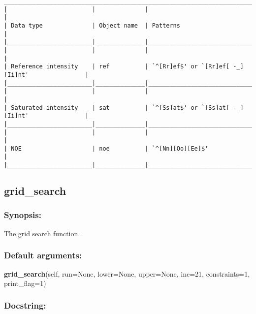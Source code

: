 {\begin{verbatim}
____________________________________________________________________________________________
|                        |              |                                                  |
| Data type              | Object name  | Patterns                                         |
|________________________|______________|__________________________________________________|
|                        |              |                                                  |
| Reference intensity    | ref          | `^[Rr]ef$' or `[Rr]ef[ -_][Ii]nt'                |
|________________________|______________|__________________________________________________|
|                        |              |                                                  |
| Saturated intensity    | sat          | `^[Ss]at$' or `[Ss]at[ -_][Ii]nt'                |
|________________________|______________|__________________________________________________|
|                        |              |                                                  |
| NOE                    | noe          | `^[Nn][Oo][Ee]$'                                 |
|________________________|______________|__________________________________________________|
\end{verbatim}
}



\newpage

\subsection{grid\_search}


\subsubsection{Synopsis:}

The grid search function.

\subsubsection{Default arguments:}

\textsf{\textbf{grid\_search}(self, run=None, lower=None, upper=None, inc=21, constraints=1, print\_flag=1)
}


\subsubsection{Docstring:}

